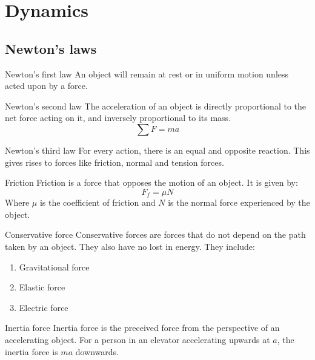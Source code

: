 

\section{Dynamics}

\subsection{Newton's laws}
\begin{definition}
    {Newton's first law}
    An object will remain at rest or in uniform motion unless acted upon by a force.
\end{definition}

\begin{definition}
    {Newton's second law}
    The acceleration of an object is directly proportional to the net force acting on it, and inversely proportional to its mass.
    \[\sum F=ma\]
\end{definition}

\begin{definition}
    {Newton's third law}
    For every action, there is an equal and opposite reaction. This gives rises to forces like friction, normal and tension forces.
\end{definition}

\begin{knBox}
    {Friction}
    Friction is a force that opposes the motion of an object. It is given by:
    \[F_f=\mu N\]
    Where $\mu$ is the coefficient of friction and $N$ is the normal force experienced by the object.
\end{knBox}

\begin{knBox}
    {Conservative force}
    Conservative forces are forces that do not depend on the path taken by an object. They also have no lost in energy. They include:
    \begin{enumerate}
        \item Gravitational force
        \item Elastic force
        \item Electric force
    \end{enumerate}
\end{knBox}

\begin{knBox}
    {Inertia force}
    Inertia force is the preceived force from the perspective of an accelerating object.
    \tcblower
    For a person in an elevator accelerating upwards at $a$, the inertia force is $ma$ downwards.
\end{knBox}

